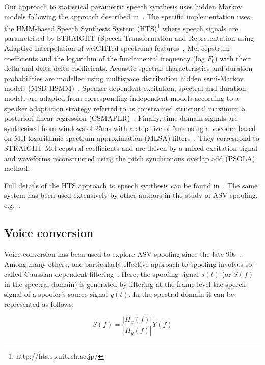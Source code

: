 Our approach to statistical parametric speech synthesis uses hidden Markov models following the approach described in~\cite{Yamagishi2009a}.  The specific implementation uses the HMM-based Speech Synthesis System (HTS)\footnote{http://hts.sp.nitech.ac.jp/} where speech signals are parametrised by STRAIGHT (Speech Transformation and Representation using Adaptive Interpolation of weiGHTed spectrum) features~\cite{Kawahara2001}, Mel-cepstrum coefficients and the logarithm of the fundamental frequency (log $F_{0}$) with their delta and delta-delta coefficients.  Acoustic spectral characteristics and duration probabilities are modelled using multispace distribution hidden semi-Markov models (MSD-HSMM)~\cite{Russell1985}.  Speaker dependent  excitation, spectral and duration models are adapted from corresponding independent models according to a speaker adaptation strategy referred to as constrained structural maximum a posteriori linear regression (CSMAPLR)~\cite{Yamagishi2009a}.  Finally, time domain signals are synthesised from windows of 25ms with a step size of 5ms using a vocoder based on Mel-logarithmic spectrum approximation (MLSA) filters~\cite{Imai1983}.  They correspond to STRAIGHT Mel-cepstral coefficients and are driven by a mixed excitation signal~\cite{Yoshimura2005} and waveforms reconstructed using the pitch synchronous overlap add (PSOLA) method.  

Full details of the HTS approach to speech synthesis can be found in~\cite{Yamagishi2009a,Yamagishi2009,Zen2007}.  The same system has been used extensively by other authors in the study of ASV spoofing, e.g.~\cite{Leon2010,DeLeon2012,Wu2013,Ergunay2015,Wu2015}.





\subsection{Voice conversion}
\label{ssec:vconv}

Voice conversion has been used to explore ASV spoofing since the late 90s~\cite{Pellom1999}.  Among many others, one particularly effective approach to spoofing involves so-called Gaussian-dependent filtering~\cite{Matrouf2005}. Here, the spoofing signal $s(t)$ (or $S(f)$ in the spectral domain) is generated by filtering at the frame level the speech signal of a spoofer's source signal $y(t)$. In the spectral domain it can be represented as follows:

\begin{equation}
S(f) = \frac{\left|H_{x}(f)\right|}{\left|H_{y}(f)\right|}Y(f)
\label{eq:conversioneq}
\end{equation}

